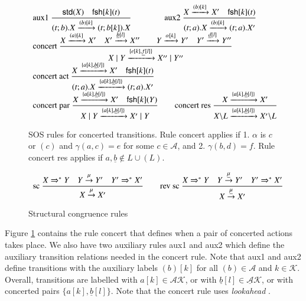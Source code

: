 \documentclass[preprint,12pt]{elsarticle}
\newcommand{\paral}{\; \vert \;}
\newcommand{\Rule}[2]{\displaystyle{\frac{#1}{#2}}}
\newcommand{\tran}[1]{\stackrel{#1}{\rightarrow}}
\newcommand{\mA}{\mathcal{A}}
\newcommand{\mAK}{\mathcal{AK}}
\newcommand{\umAK}{\underline{\mathcal{A}}\mathcal{K}}
\newcommand{\rom}[1]{\mbox{\rm{#1}}}
\newcommand{\std}[1]{\mathsf{std}(#1)}
\newcommand{\Keys}{\mathcal{K}}
\newcommand{\fresh}[2]{\mathsf{fsh}[#1](#2)}
\begin{document}
\begin{figure}[t] 
\[
\begin{array}{l}
\rom{aux1}\ 
\Rule{\std{X} \quad \fresh{k}{t}}
{(t;b).X \xrightarrow{(b)[k]}(t;b[k]).X}
\qquad\qquad
\rom{aux2}\
\Rule
{X \xrightarrow{(b)[k]} X' \quad \fresh{k}{t}}
{(t;a).X \xrightarrow{(b)[k]} (t;a).X'}
\\
\rom{concert}\ 
\Rule
{X\xrightarrow{(a)[k]}X' \quad X'\xrightarrow{\underline{b}[l]}X'' \qquad Y\xrightarrow{\alpha[k]}Y' 
  \quad Y'\xrightarrow{\underline{d}[l]}Y''%
 }
{X \paral Y\xrightarrow{\{e[k],\underline{f}[l]\}} X'' \paral Y''}\\%
\rom{concert act}\
\Rule
{X \xrightarrow{\{{a}[k], \underline{b}[l]\}} X' \quad \fresh{k}{t}}
{(t;a).X \xrightarrow{\{{a}[k], \underline{b}[l]\}} (t;a).X'}\\%
\rom{concert par}\
\Rule
{X \xrightarrow{\{{a}[k], \underline{b}[l]\}} X'\quad \fresh{k}{Y}}
{X \paral Y \xrightarrow{\{{a}[k], \underline{b}[l]\}} X' \paral Y}\qquad
\rom{concert res}\
\Rule
{X \xrightarrow{\{{a}[k], \underline{b}[l]\}} X'}
{X\backslash L \xrightarrow{\{{a}[k], \underline{b}[l]\}} X'\backslash L}
%
\end{array}
\] 
\caption{SOS rules for concerted transitions. Rule concert applies if 1. $\alpha$ is $c$ or $(c)$
and $\gamma(a,c)=e$ for some $c\in \mathcal{A}$, and 2. $\gamma(b,d)=f$. Rule concert res applies
if $a, \underline{b}  \notin L \cup (L)$.}
\label{fig:csos}
\end{figure}

\begin{figure}[t] 
\[
\begin{array}{l}
\rom{sc}\
\Rule
{X \Rightarrow^* Y \quad Y \tran{\mu} Y' \quad Y' \Rightarrow^* X'}
{X\tran{\mu} X'} \qquad 
%
\rom{rev sc}\
\Rule
{X \Rightarrow^* Y \quad Y \tran{\underline{\mu}} Y' \quad Y' \Rightarrow^* X'}
{X\tran{\underline{\mu}} X'} \quad 
\end{array}
\] 
\caption{Structural congruence rules} \label{fig:sc}
\end{figure}
\renewcommand{\arraystretch}{1}

Figure \ref{fig:csos} contains the rule concert that defines when a pair of concerted actions 
takes place. We also have two auxiliary rules aux1 and aux2 which define the auxiliary 
transition relations needed in the concert rule. Note that aux1 and aux2 define transitions 
with the auxiliary labels $(b)[k]$ for all $(b) \in \mA$ and $k \in \Keys$.  Overall, 
transitions are labelled with $a[k] \in \mAK$, or with $\underline{b}[l] \in \umAK$, or with 
concerted pairs $\{a[k], \underline{b}[l]\}$.
Note that the concert rule uses \emph{lookahead} \cite{Uli92}.
\end{document}
